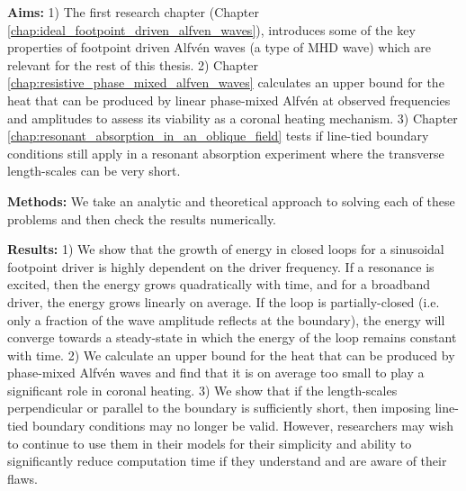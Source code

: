 \begin{spacing}{1.1}
\textbf{Aims:}
1) The first research chapter (Chapter \ref{chap:ideal_footpoint_driven_alfven_waves}), introduces some of the key properties of footpoint driven Alfv\'en waves (a type of MHD wave) which are relevant for the rest of this thesis.
2) Chapter \ref{chap:resistive_phase_mixed_alfven_waves} calculates an upper bound for the heat that can be produced by linear phase-mixed Alfv\'en at observed frequencies and amplitudes to assess its viability as a coronal heating mechanism.
3) Chapter \ref{chap:resonant_absorption_in_an_oblique_field} tests if line-tied boundary conditions still apply in a resonant absorption experiment where the transverse length-scales can be very short.

\textbf{Methods:} We take an analytic and theoretical approach to solving each of these problems and then check the results numerically.

\textbf{Results:} 1) We show that the growth of energy in closed loops for a sinusoidal footpoint driver is highly dependent on the driver frequency. If a resonance is excited, then the energy grows quadratically with time, and for a broadband driver, the energy grows linearly on average. If the loop is partially-closed (i.e. only a fraction of the wave amplitude reflects at the boundary), the energy will converge towards a steady-state in which the energy of the loop remains constant with time. 
2) We calculate an upper bound for the heat that can be produced by phase-mixed Alfv\'en waves and find that it is on average too small to play a significant role in coronal heating. 
3) We show that if the length-scales perpendicular or parallel to the boundary is sufficiently short, then imposing line-tied boundary conditions may no longer be valid. However, researchers may wish to continue to use them in their models for their simplicity and ability to significantly reduce computation time if they understand and are aware of their flaws.

\end{spacing}